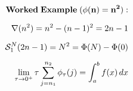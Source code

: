 \documentclass[preview]{standalone}
\begin{document}
\begin{align*}
\special{dvisvgm:raw <g id='unique000'>}\mathbf{Worked\;Example\;(\phi(n)=n^2):}\\[6pt]\nabla(n^2) = n^2 - (n-1)^2 = 2n - 1\\[6pt]\mathcal{S}_1^N(2n-1) = N^2 = \Phi(N)-\Phi(0)\\[6pt]\lim_{\tau\to 0^+}\tau\sum_{j=n_1}^{n_2}\phi_\tau(j) = \int_a^b f(x)\,dx\special{dvisvgm:raw </g>}
\end{align*}
\end{document}
